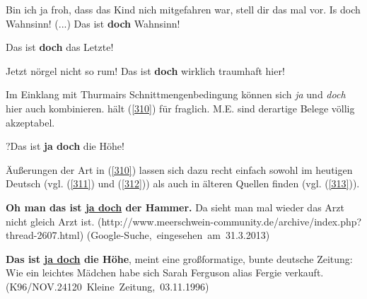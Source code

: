 \begin{exe}
	\ex\label{307} 
	Bin ich ja froh, dass das Kind nich mitgefahren war, stell dir das mal vor. Is doch Wahnsinn! (...) Das ist \textbf{doch} Wahnsinn!
\end{exe}
\vspace{-0.65cm}	
\begin{exe}
	\ex\label{308} 
	Das ist \textbf{doch} das Letzte!
\end{exe}	
\vspace{-0.65cm}
\begin{exe}
	\ex\label{309} 
	Jetzt nörgel nicht so rum! Das ist \textbf{doch} wirklich traumhaft hier!
	\newline
	\hbox{}\hfill\hbox{\citet[114-115]{Thurmair1989}}	
\end{exe}
Im Einklang mit Thurmairs Schnittmengenbedingung können sich \textit{ja} und \textit{doch} hier auch kombinieren. \citet[235]{Rinas2006} hält (\ref{310}) für fraglich. M.E. sind derartige Belege völlig akzeptabel.

\begin{exe}
	\ex\label{310} 
	?Das ist \textbf{ja doch} die Höhe!	
\end{exe}
Äußerungen der Art in (\ref{310}) lassen sich dazu recht einfach sowohl im heutigen Deutsch (vgl. (\ref{311}) und (\ref{312})) als auch in älteren Quellen finden (vgl. (\ref{313})).
\begin{exe}
	\ex\label{311} 
	\scriptsize
	\textbf{Oh man das ist \underline{ja doch} der Hammer.} Da sieht man mal wieder das Arzt nicht gleich Arzt ist. 
	\newline
	\hbox{}\hfill\hbox{(http://www.meerschwein-community.de/archive/index.php?thread-2607.html)}	
	\newline
	\hbox{}\hfill\hbox{(Google-Suche, eingesehen am 31.3.2013)}	
\end{exe}
	      
\begin{exe}
	\ex\label{312} 
	\scriptsize
	\textbf{Das ist \underline{ja doch} die Höhe}, meint eine großformatige, bunte deutsche Zeitung: \glqq Wie ein leichtes Mädchen\grqq{} habe sich Sarah 	Ferguson alias Fergie \glqq verkauft\grqq{}. 
	\hfill\hbox{(K96/NOV.24120 Kleine Zeitung, 03.11.1996)}	
\end{exe}
	
